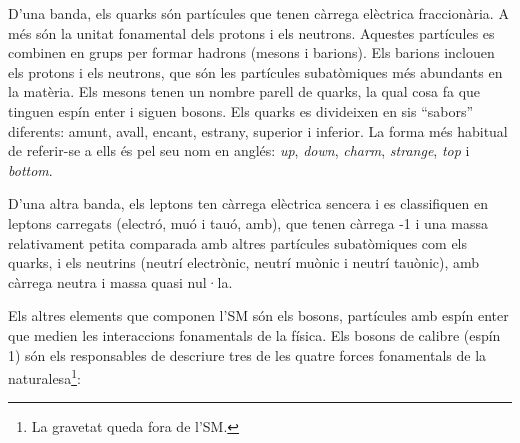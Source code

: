 D'una banda, els quarks són partícules que tenen càrrega elèctrica fraccionària. A més són la unitat fonamental 
dels protons i els neutrons. Aquestes partícules es combinen en grups per formar hadrons (mesons i barions). Els barions 
inclouen els protons i els neutrons, que són les partícules subatòmiques més abundants en la matèria. Els mesons tenen un 
nombre parell de quarks, la qual cosa fa que tinguen espín enter i siguen bosons. Els quarks es divideixen en sis ``sabors'' 
diferents: amunt, avall, encant, estrany, superior i inferior. La forma més habitual de referir-se a ells és pel seu nom en anglés: 
\textit{up}, \textit{down}, \textit{charm}, \textit{strange}, \textit{top} i \textit{bottom}.

D'una altra banda, els leptons ten càrrega elèctrica sencera i es classifiquen en leptons carregats (electró, muó i tauó, amb), que
tenen càrrega -1 i una massa relativament petita comparada amb altres partícules subatòmiques com els quarks,
i els neutrins (neutrí electrònic, neutrí muònic i neutrí tauònic), amb càrrega neutra i massa quasi nul·la.

Els altres elements que componen l'SM són els bosons, partícules amb espín enter que medien les 
interaccions fonamentals de la física. Els bosons de calibre (espín 1) són els responsables de descriure 
tres de les quatre forces fonamentals de la naturalesa\footnote{La gravetat queda fora de l'SM.}:

